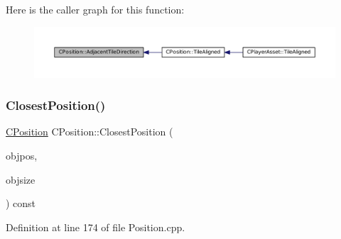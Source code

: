 Here is the caller graph for this function\+:
\nopagebreak
\begin{figure}[H]
\begin{center}
\leavevmode
\includegraphics[width=350pt]{classCPosition_a2295901e4c35cfc81304f9a217e34ac7_icgraph}
\end{center}
\end{figure}
\hypertarget{classCPosition_a91fd43eeb2c894bcb7577ae87247b726}{}\label{classCPosition_a91fd43eeb2c894bcb7577ae87247b726} 
\subsubsection{\texorpdfstring{Closest\+Position()}{ClosestPosition()}}
{\footnotesize\ttfamily \hyperlink{classCPosition}{C\+Position} C\+Position\+::\+Closest\+Position (\begin{DoxyParamCaption}\item[{const \hyperlink{classCPosition}{C\+Position} \&}]{objpos,  }\item[{int}]{objsize }\end{DoxyParamCaption}) const}



Definition at line 174 of file Position.\+cpp.


